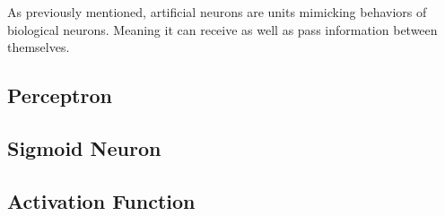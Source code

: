 As previously mentioned, artificial neurons are units mimicking behaviors of biological neurons.
Meaning it can receive as well as pass information between themselves.

\subsection{Perceptron}

\subsection{Sigmoid Neuron}

\subsection{Activation Function}

